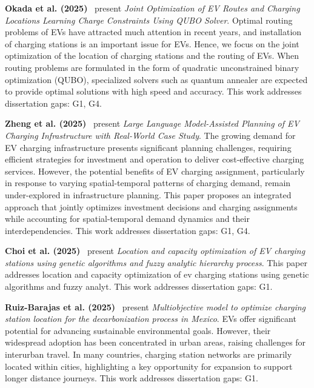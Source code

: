 \documentclass[letterpaper, 12pt, oneside, doublespacing]{Thesis}
\begin{document}
\noindent \textbf{Okada et al. (2025)}~\cite{joint_optimization_2025} present \textit{Joint Optimization of EV Routes and Charging Locations Learning Charge Constraints Using QUBO Solver}. Optimal routing problems of EVs have attracted much attention in recent years, and installation of charging stations is an important issue for EVs. Hence, we focus on the joint optimization of the location of charging stations and the routing of EVs. When routing problems are formulated in the form of quadratic unconstrained binary optimization (QUBO), specialized solvers such as quantum annealer are expected to provide optimal solutions with high speed and accuracy. This work addresses dissertation gaps: G1, G4.



\noindent \textbf{Zheng et al. (2025)}~\cite{large_language_2025} present \textit{Large Language Model-Assisted Planning of EV Charging Infrastructure with Real-World Case Study}. The growing demand for EV charging infrastructure presents significant planning challenges, requiring efficient strategies for investment and operation to deliver cost-effective charging services. However, the potential benefits of EV charging assignment, particularly in response to varying spatial-temporal patterns of charging demand, remain under-explored in infrastructure planning. This paper proposes an integrated approach that jointly optimizes investment decisions and charging assignments while accounting for spatial-temporal demand dynamics and their interdependencies. This work addresses dissertation gaps: G1, G4.



\noindent \textbf{Choi et al. (2025)}~\cite{location_and_2025} present \textit{Location and capacity optimization of EV charging stations using genetic algorithms and fuzzy analytic hierarchy process}. This paper addresses location and capacity optimization of ev charging stations using genetic algorithms and fuzzy analyt. This work addresses dissertation gaps: G1.



\noindent \textbf{Ruiz-Barajas et al. (2025)}~\cite{multiobjective_model_2025} present \textit{Multiobjective model to optimize charging station location for the decarbonization process in Mexico}. EVs offer significant potential for advancing sustainable environmental goals. However, their widespread adoption has been concentrated in urban areas, raising challenges for interurban travel. In many countries, charging station networks are primarily located within cities, highlighting a key opportunity for expansion to support longer distance journeys. This work addresses dissertation gaps: G1.
\end{document}

